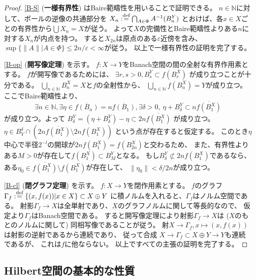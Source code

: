 \documentclass[uplatex]{jsarticle}
\theoremstyle{definition}
\newcommand{\ep}{\varepsilon}
\newcommand{\dfn}{:\overset{\mbox{{\scriptsize def}}}{=}}
\newcommand{\N}{\mathbb{N}}
\begin{document}
\begin{proof}
  \ref{B-S} (\textbf{一様有界性}) はBaire範疇性を用いることで証明できる。
  \(n\in \N\)に対して、ボールの逆像の共通部分を
  \(X_n\dfn \bigcap_{A\in \Phi}A^{-1}(B_n^Y)\)
  とおけば、各\(x\in X\)ごとの有界性から\(\bigcup X_n = X\)が従う。
  よって\(X\)の完備性とBaire範疇性よりある\(n\)に対する\(X_n\)が内点を持つ。
  すると\(X_{2n}\)は原点のある\(\ep\)近傍を含み、
  \(\sup\{\|A\| | A\in\Phi\} \leq 2n/\ep < \infty\)が従う。
  以上で一様有界性の証明を完了する。

  \ref{B-op} (\textbf{開写像定理}) を示す。
  \(f:X \to Y\)をBanach空間の間の全射な有界作用素とする。
  \(f\)が開写像であるためには、
  \(\exists r,s > 0, B_s^Y\subset f(B_r^X)\)
  が成り立つことが十分である。
  \(\bigcup_{n\in \N} B_n^X = X\)と\(f\)の全射性から、
  \(\bigcup_{n\in \N} f(B_n^X) = Y\)が成り立つ。ここでBaire範疇性より、
  \[
  \exists n\in \N, \exists \eta \in \overline{f(B_n)} = n\overline{f(B_1)}, \exists \delta > 0, \
  \eta + B^Y_{\delta}\subset n\overline{f(B_1^X)}
  \]
  が成り立つ。よって
  \(B^Y_{\delta} = (\eta + B^Y_{\delta}) - \eta \subset 2n\overline{f(B_1^X)}\)
  が成り立つ。
  \(\eta\in B_Y^{\delta}\cap (2n\overline{f(B_1^X)}\setminus 2nf(B_1^X))\)
  という点が存在すると仮定する。
  このとき\(\eta\)中心で半径\(2^{-l}\)の開球が\(2nf(B_1^X) = f(B_{2n}^X)\)と交わるため、
  また、有界性よりある\(M > 0\)が存在して\(f(B_1^X) \subset B_M^Y\)となる。
  もし\(B^Y_{\delta}\not\subset 2nf(B_1^X)\)であるなら、
  ある\(\eta_0\in \overline{f(B_1^X)}\setminus f(B_1^X)\)が存在して、
  \(\|\eta_0\| < \delta/2n\)が成り立つ。


  \ref{B-cl} (\textbf{閉グラフ定理}) を示す。
  \(f:X\to Y\)を閉作用素とする。
  \(f\)のグラフ\(\Gamma_f\dfn \{(x,f(x))|x\in X\}\subset X\oplus Y\)
  に積ノルムを入れると、\(\Gamma_f\)はノルム空間である。
  射影\(\Gamma_f\to X\)は全単射であり、\(X\)のグラフノルムに関して等長的なので、
  仮定より\(\Gamma_f\)はBanach空間である。
  すると開写像定理により射影\(\Gamma_f\to X\)は
  (\(X\)のもとのノルムに関して)
  同相写像であることが従う。
  射\(X\to \Gamma_f, x\mapsto (x,f(x))\)
  は射影の逆射であるから連続であり、
  従って合成
  \(X\to \Gamma_f\subset X\oplus Y \to Y\)も連続であるが、
  これは\(f\)に他ならない。
  以上ですべての主張の証明を完了する。
\end{proof}






\subsection{Hilbert空間の基本的な性質}
\end{document}
